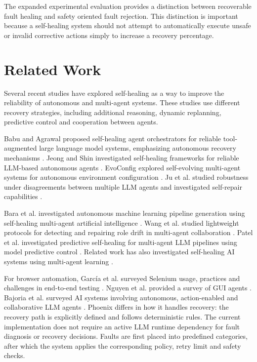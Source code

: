 \documentclass[conference]{IEEEtran}
\begin{document}
The expanded experimental evaluation provides a distinction between recoverable fault healing and safety oriented fault rejection. This distinction is important because a self-healing system should not attempt to automatically execute unsafe or invalid corrective actions simply to increase a recovery percentage.

\section{Related Work}
Several recent studies have explored self-healing as a way to improve the reliability of autonomous and multi-agent systems. These studies use different recovery strategies, including additional reasoning, dynamic replanning, predictive control and cooperation between agents.

Babu and Agrawal proposed self-healing agent orchestrators for reliable tool-augmented large language model systems, emphasizing autonomous recovery mechanisms \cite{babu2026}. Jeong and Shin investigated self-healing frameworks for reliable LLM-based autonomous agents \cite{jeong2026}. EvoConfig explored self-evolving multi-agent systems for autonomous environment configuration \cite{guo2026}. Ju et al. studied robustness under disagreements between multiple LLM agents and investigated self-repair capabilities \cite{ju2025}.

Bara et al. investigated autonomous machine learning pipeline generation using self-healing multi-agent artificial intelligence \cite{bara2026}. Wang et al. studied lightweight protocols for detecting and repairing role drift in multi-agent collaboration \cite{wang2026}. Patel et al. investigated predictive self-healing for multi-agent LLM pipelines using model predictive control \cite{patel2026sustech}. Related work has also investigated self-healing AI systems using multi-agent learning \cite{patel2026isiber}.

For browser automation, Garc\'ia et al. surveyed Selenium usage, practices and challenges in end-to-end testing \cite{garcia2026}. Nguyen et al. provided a survey of GUI agents \cite{nguyen2025}. Bajoria et al. surveyed AI systems involving autonomous, action-enabled and collaborative LLM agents \cite{bajoria2026}. Phoenix differs in how it handles recovery: the recovery path is explicitly defined and follows deterministic rules. The current implementation does not require an active LLM runtime dependency for fault diagnosis or recovery decisions. Faults are first placed into predefined categories, after which the system applies the corresponding policy, retry limit and safety checks.
\end{document}
